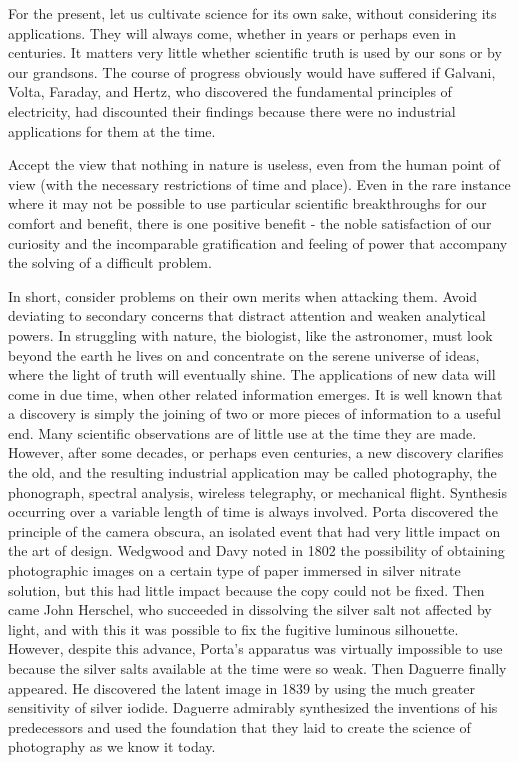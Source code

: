 \documentclass{article}
\begin{document}
For the present, let us cultivate science for its own sake, without considering its applications. They will always come, whether in years or perhaps even in centuries. It matters very little whether scientific truth is used by our sons or by our grandsons. The course of progress obviously would have suffered if Galvani, Volta, Faraday, and Hertz, who discovered the fundamental principles of electricity, had discounted their findings because there were no industrial applications for them at the time.

Accept the view that nothing in nature is useless, even from the human point of view (with the necessary restrictions of time and place). Even in the rare instance where it may not be possible to use particular scientific breakthroughs for our comfort and benefit, there is one positive benefit - the noble satisfaction of our curiosity and the incomparable gratification and feeling of power that accompany the solving of a difficult problem.

In short, consider problems on their own merits when attacking them. Avoid deviating to secondary concerns that distract attention and weaken analytical powers. In struggling with nature, the biologist, like the astronomer, must look beyond the earth he lives on and concentrate on the serene universe of ideas, where the light of truth will eventually shine. The applications of new data will come in due time, when other related information emerges. It is well known that a discovery is simply the joining of two or more pieces of information to a useful end. Many scientific observations are of little use at the time they are made. However, after some decades, or perhaps even centuries, a new discovery clarifies the old, and the resulting industrial application may be called photography, the phonograph, spectral analysis, wireless telegraphy, or mechanical flight. Synthesis occurring over a variable length of time is always involved. Porta discovered the principle of the camera obscura, an isolated event that had very little impact on the art of design. Wedgwood and Davy noted in 1802 the possibility of obtaining photographic images on a certain type of paper immersed in silver nitrate solution, but this had little impact because the copy could not be fixed. Then came John Herschel, who succeeded in dissolving the silver salt not affected by light, and with this it was possible to fix the fugitive luminous silhouette. However, despite this advance, Porta’s apparatus was virtually impossible to use because the silver salts available at the time were so weak. Then Daguerre finally appeared. He discovered the latent image in 1839 by using the much greater sensitivity of silver iodide. Daguerre admirably synthesized the inventions of his predecessors and used the foundation that they laid to create the science of photography as we know it today.
\end{document}
